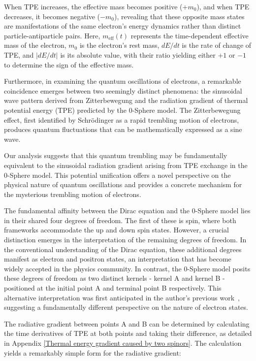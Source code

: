 \documentclass[%
 reprint,
 amsmath,amssymb,
 aps,
]{revtex4-1}
\numberwithin{equation}{section}%
\begin{document}
When TPE increases, the effective mass becomes positive ($+m_0$), and when TPE decreases, it becomes negative ($-m_0$), revealing that these opposite mass states are manifestations of the same electron's energy dynamics rather than distinct particle-antiparticle pairs. Here, $m_{\text{eff}}(t)$ represents the time-dependent effective mass of the electron, $m_0$ is the electron's rest mass, $dE/dt$ is the rate of change of TPE, and $|dE/dt|$ is its absolute value, with their ratio yielding either $+1$ or $-1$ to determine the sign of the effective mass.

Furthermore, in examining the quantum oscillations of electrons, a remarkable coincidence emerges between two seemingly distinct phenomena: the sinusoidal wave pattern derived from Zitterbewegung and the radiation gradient of thermal potential energy (TPE) predicted by the 0-Sphere model. The Zitterbewegung effect, first identified by Schrödinger as a rapid trembling motion of electrons, produces quantum fluctuations that can be mathematically expressed as a sine wave.

Our analysis suggests that this quantum trembling may be fundamentally equivalent to the sinusoidal radiation gradient arising from TPE exchange in the 0-Sphere model. This potential unification offers a novel perspective on the physical nature of quantum oscillations and provides a concrete mechanism for the mysterious trembling motion of electrons.

The fundamental affinity between the Dirac equation and the 0-Sphere model lies in their shared four degrees of freedom. The first of these is spin, where both frameworks accommodate the up and down spin states. However, a crucial distinction emerges in the interpretation of the remaining degrees of freedom. In the conventional understanding of the Dirac equation, these additional degrees manifest as electron and positron states, an interpretation that has become widely accepted in the physics community. In contrast, the 0-Sphere model posits these degrees of freedom as two distinct kernels - kernel A and kernel B - positioned at the initial point A and terminal point B respectively. This alternative interpretation was first anticipated in the author's previous work~\cite{hanamura2020}, suggesting a fundamentally different perspective on the nature of electron states.

The radiative gradient between points A and B can be determined by calculating the time derivatives of TPE at both points and taking their difference, as detailed in Appendix \ref{Thermal energy gradient caused by two spinors}. The calculation yields a remarkably simple form for the radiative gradient:
\end{document}
